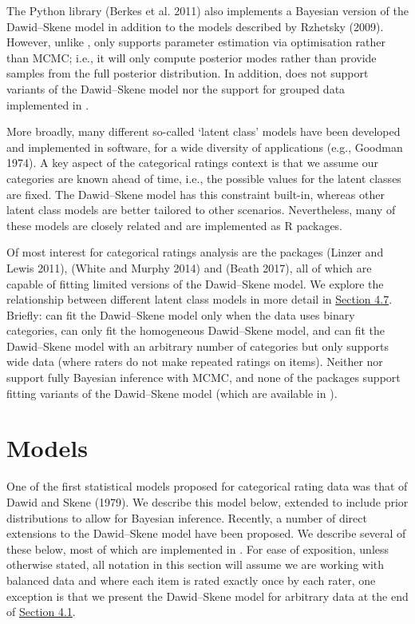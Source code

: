 The Python library  (Berkes et al. 2011) also implements a Bayesian
version of the Dawid--Skene model in addition to the models described by
Rzhetsky (2009). However, unlike ,  only
supports parameter estimation via optimisation rather than MCMC; i.e., it will
only compute posterior modes rather than provide samples from the full posterior
distribution. In addition,  does not support variants of the
Dawid--Skene model nor the support for grouped data implemented in
.

More broadly, many different so-called `latent class' models have been
developed and implemented in software, for a wide diversity of applications
(e.g., Goodman 1974). A key aspect of the categorical ratings context
is that we assume our categories are known ahead of time, i.e., the possible
values for the latent classes are fixed. The Dawid--Skene model has this
constraint built-in, whereas other latent class models are better tailored to
other scenarios. Nevertheless, many of these models are closely related and
are implemented as R packages.

Of most interest for categorical ratings analysis are the packages
 (Linzer and Lewis 2011),  (White and Murphy 2014) and
 (Beath 2017), all of which are capable of fitting
limited versions of the Dawid--Skene model. We explore the relationship
between different latent class models in more detail in \protect\hyperlink{sec:relationships-existing-models}{Section
4.7}. Briefly:  can
fit the Dawid--Skene model only when the data uses binary categories,
 can only fit the homogeneous Dawid--Skene model, and
 can fit the Dawid--Skene model with an arbitrary number of
categories but only supports wide data (where raters do not make repeated
ratings on items). Neither  nor  support
fully Bayesian inference with MCMC, and none of the packages support fitting
variants of the Dawid--Skene model (which are available in ).

\hypertarget{sec:models}{%
\section{Models}\label{sec:models}}

One of the first statistical models proposed for categorical rating data was
that of Dawid and Skene (1979). We describe this model below, extended to include
prior distributions to allow for Bayesian inference. Recently, a number of
direct extensions to the Dawid--Skene model have been proposed. We describe
several of these below, most of which are implemented in . For
ease of exposition, unless otherwise stated, all notation in this section will
assume we are working with balanced data and where each item is rated exactly
once by each rater, one exception is that we present the Dawid--Skene model
for arbitrary data at the end of \protect\hyperlink{sec:dawid-skene}{Section 4.1}.

